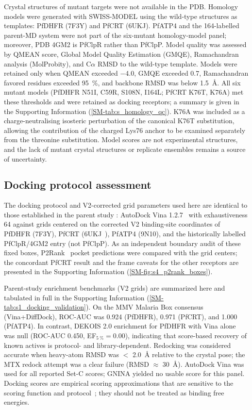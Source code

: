 \documentclass[journal=jcisd8,manuscript=article,layout=traditional]{achemso}
\begin{document}
Crystal structures of mutant targets were not available in the PDB. Homology models were generated with SWISS-MODEL using the wild-type structures as templates: PfDHFR (7F3Y) and PfCRT (6UKJ). PfATP4 and the 164-labelled parent-MD system were not part of the six-mutant homology-model panel; moreover, PDB 4GM2 is PfClpR rather than PfClpP. Model quality was assessed by QMEAN score, Global Model Quality Estimation (GMQE), Ramachandran analysis (MolProbity), and C$\alpha$ RMSD to the wild-type template. Models were retained only when QMEAN exceeded \num{-4.0}, GMQE exceeded \num{0.7}, Ramachandran favored residues exceeded \qty{95}{\percent}, and backbone RMSD was below \qty{1.5}{\angstrom}. All six mutant models (PfDHFR N51I, C59R, S108N, I164L; PfCRT K76T, K76A) met these thresholds and were retained as docking receptors; a summary is given in the Supporting Information (\cref{SM-tab:s_homology_qc}). K76A was included as a charge-neutralising isosteric perturbation of the canonical K76T substitution, allowing the contribution of the charged Lys76 anchor to be examined separately from the threonine substitution. Model scores are not experimental structures, and the lack of mutant crystal structures or replicate ensembles remains a source of uncertainty.

\subsection{Docking protocol assessment}

The docking protocol and V2-corrected grid parameters used here are identical to those established in the parent study \citep{temgoua2026chemrxiv}: AutoDock Vina 1.2.7~\citep{vina_2021} with exhaustiveness \num{64} against grids centered on the corrected V2 binding-site coordinates of PfDHFR (7F3Y), PfCRT (6UKJ~\citep{Kim2019PfCRT}), PfATP4 (9N10), and the historically labelled PfClpR/4GM2 entry (not PfClpP). As an independent boundary audit of these fixed boxes, P2Rank~\citep{Krivak2018P2Rank} pocket predictions were compared with the grid centers; the concordant PfCRT result and the frame caveats for the other receptors are presented in the Supporting Information (\cref{SM-fig:s4_p2rank_boxes}).

Parent-study enrichment benchmarks (V2 grids) are summarized here and tabulated in full in the Supporting Information (\cref{SM-tab:s1_docking_validation}). On the MMV Malaria Box consensus (Vina+DiffDock), ROC-AUC was \num{0.924} (PfDHFR), \num{0.971} (PfCRT), and \num{1.000} (PfATP4). In contrast, DEKOIS 2.0 enrichment for PfDHFR with Vina alone was null (ROC-AUC \num{0.450}, EF$_{\qty{5}{\percent}}=\num{0.00}$), indicating that score-based recovery of known actives is protocol- and library-dependent. Redocking was considered accurate when heavy-atom RMSD was $<$ \qty{2.0}{\angstrom} relative to the crystal pose; the MTX redock attempt was a clear failure (RMSD $\approx$ \qty{30}{\angstrom}). AutoDock Vina was used for all reported Set-C scores; GNINA yielded no usable score for this panel. Docking scores are empirical scoring approximations that are sensitive to the scoring function and protocol~\citep{ferreira2023docking,sadybekov2023computational,kittelson2026docking}; they should not be treated as binding free energies.
\end{document}
